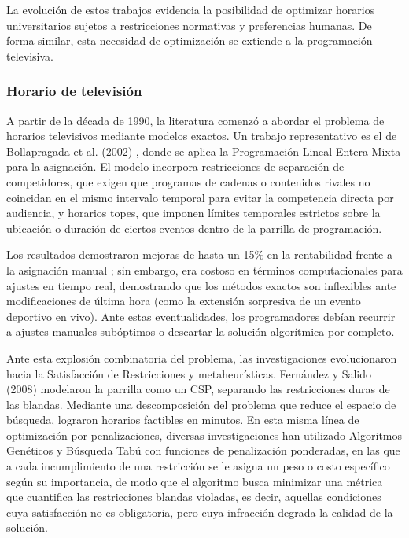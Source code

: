 \documentclass{article}
\begin{document}
La evolución de estos trabajos evidencia la posibilidad de optimizar horarios universitarios sujetos a restricciones normativas y preferencias humanas. De forma similar, esta necesidad de optimización se extiende a la programación televisiva.

\subsubsection{Horario de televisión}

A partir de la década de 1990, la literatura comenzó a abordar el problema de horarios televisivos mediante modelos exactos. Un trabajo representativo es el de Bollapragada et al. (2002) \cite{bollapragada2002}, donde se aplica la Programación Lineal Entera Mixta para la asignación. El modelo incorpora restricciones de separación de competidores, que exigen que programas de cadenas o contenidos rivales no coincidan en el mismo intervalo temporal para evitar la competencia directa por audiencia, y horarios topes, que imponen límites temporales estrictos sobre la ubicación o duración de ciertos eventos dentro de la parrilla de programación. 

Los resultados demostraron mejoras de hasta un 15\% en la rentabilidad frente a la asignación manual \cite{bollapragada2002}; sin embargo, era costoso en términos computacionales para ajustes en tiempo real, demostrando que los métodos exactos son inflexibles ante modificaciones de última hora (como la extensión sorpresiva de un evento deportivo en vivo). Ante estas eventualidades, los programadores debían recurrir a ajustes manuales subóptimos o descartar la solución algorítmica por completo.

Ante esta explosión combinatoria del problema, las investigaciones evolucionaron hacia la Satisfacción de Restricciones y metaheurísticas. Fernández y Salido (2008) \cite{fernandez2008} modelaron la parrilla como un CSP, separando las restricciones duras de las blandas. Mediante una descomposición del problema que reduce el espacio de búsqueda, lograron horarios factibles en minutos. En esta misma línea de optimización por penalizaciones, diversas investigaciones \cite{garcia2016} han utilizado Algoritmos Genéticos y Búsqueda Tabú con funciones de penalización ponderadas, en las que a cada incumplimiento de una restricción se le asigna un peso o costo específico según su importancia, de modo que el algoritmo busca minimizar una métrica que cuantifica las restricciones blandas violadas, es decir, aquellas condiciones cuya satisfacción no es obligatoria, pero cuya infracción degrada la calidad de la solución.
\end{document}
